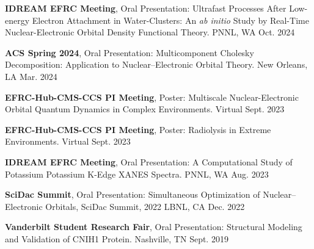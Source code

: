 


\begin{cvpresentations}


\cvpresentation
{\textbf{IDREAM EFRC Meeting}, Oral Presentation: 
Ultrafast Processes After Low-energy Electron Attachment in Water-Clusters: An \textit{ab initio} Study by Real-Time Nuclear-Electronic Orbital Density Functional Theory.
}
{PNNL, WA} %
{Oct. 2024} %

\cvpresentation
{\textbf{ACS Spring 2024}, Oral Presentation: 
Multicomponent Cholesky Decomposition: Application to Nuclear–Electronic Orbital Theory.
} %
{New Orleans, LA} %
{Mar. 2024} %


\cvpresentation
{\textbf{EFRC-Hub-CMS-CCS PI Meeting}, Poster: 
Multiscale Nuclear-Electronic Orbital Quantum Dynamics in Complex Environments.
}
{Virtual} %
{Sept. 2023} %


\cvpresentation
{\textbf{EFRC-Hub-CMS-CCS PI Meeting}, Poster:
Radiolysis in Extreme Environments.
}
{Virtual}
{Sept. 2023} %


\cvpresentation
{\textbf{IDREAM EFRC Meeting}, Oral Presentation: 
A Computational Study of Potassium Potassium K-Edge XANES Spectra.
}
{PNNL, WA} %
{Aug. 2023} %



\cvpresentation
{\textbf{SciDac Summit}, Oral Presentation: 
Simultaneous Optimization of Nuclear–Electronic Orbitals, 
SciDac Summit, 2022} %
{LBNL, CA} %
{Dec. 2022} %


\cvpresentation
{\textbf{Vanderbilt Student Research Fair}, Oral Presentation: 
Structural Modeling and Validation of CNIH1 Protein. } %
{Nashville, TN} %
{Sept. 2019} %



\end{cvpresentations}
\vspace{-1cm}
